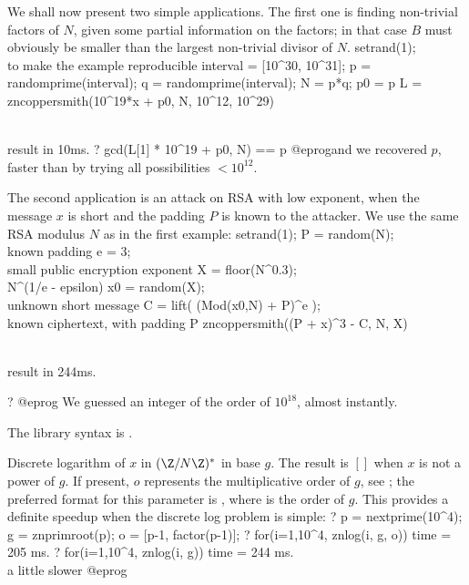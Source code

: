 We shall now present two simple applications. The first one is
finding non-trivial factors of $N$, given some partial information on the
factors; in that case $B$ must obviously be smaller than the largest
non-trivial divisor of $N$.
\bprog
setrand(1); \\ to make the example reproducible
interval = [10^30, 10^31];
p = randomprime(interval);
q = randomprime(interval); N = p*q;
p0 = p %
L = zncoppersmith(10^19*x + p0, N, 10^12, 10^29)

\\ result in 10ms.
? gcd(L[1] * 10^19 + p0, N) == p
@eprog\noindent and we recovered $p$, faster than by trying all
possibilities $ < 10^{12}$.

The second application is an attack on RSA with low exponent, when the
message $x$ is short and the padding $P$ is known to the attacker. We use
the same RSA modulus $N$ as in the first example:
\bprog
setrand(1);
P = random(N);    \\ known padding
e = 3;            \\ small public encryption exponent
X = floor(N^0.3); \\ N^(1/e - epsilon)
x0 = random(X);   \\ unknown short message
C = lift( (Mod(x0,N) + P)^e ); \\ known ciphertext, with padding P
zncoppersmith((P + x)^3 - C, N, X)

\\ result in 244ms.

? %
@eprog\noindent
We guessed an integer of the order of $10^{18}$, almost instantly.

The library syntax is .

\label{se:znlog}
Discrete logarithm of $x$ in $(\Z/N\Z)^*$ in base $g$.
The result is $[]$ when $x$ is not a power of $g$.
If present, $o$ represents the multiplicative order of $g$, see
; the preferred format for this parameter is
, where  is the order of $g$.
This provides a definite speedup when the discrete log problem is simple:
\bprog
? p = nextprime(10^4); g = znprimroot(p); o = [p-1, factor(p-1)];
? for(i=1,10^4, znlog(i, g, o))
time = 205 ms.
? for(i=1,10^4, znlog(i, g))
time = 244 ms. \\ a little slower
@eprog

